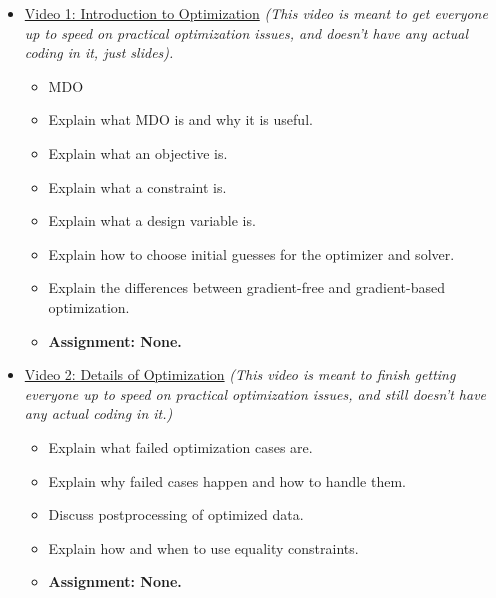 \documentclass[12pt, letterpaper]{article}
\begin{document}
\begin{itemize}


	\item \underline{Video 1: Introduction to Optimization} \textit{(This video is meant to get everyone up to speed on practical optimization issues, and doesn't have any actual coding in it, just slides).} 
		\begin{itemize}
			\item MDO
			\item Explain what MDO is and why it is useful.
			\item Explain what an objective is.
			\item Explain what a constraint is.
			\item Explain what a design variable is.
			\item Explain how to choose initial guesses for the optimizer and solver.
			\item Explain the differences between gradient-free and gradient-based optimization.
			\item \textbf{Assignment: None.}
		\end{itemize}

	\item \underline{Video 2: Details of Optimization} \textit{(This video is meant to finish getting everyone up to speed on practical optimization issues, and still doesn't have any actual coding in it.)} 
		\begin{itemize}
			\item Explain what failed optimization cases are.
			\item Explain why failed cases happen and how to handle them.
			\item Discuss postprocessing of optimized data.
			\item Explain how and when to use equality constraints.
			\item \textbf{Assignment: None.}
		\end{itemize}


\end{itemize}
\end{document}
